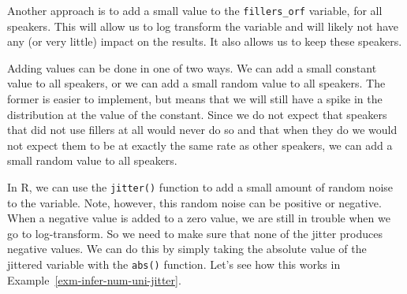 \documentclass[
  letterpaper,
  krantz1]{latex/krantz-mod}
\theoremstyle{definition}
\theoremstyle{definition}
\theoremstyle{remark}
\begin{document}
Another approach is to add a small value to the \texttt{fillers\_orf}
variable, for all speakers. This will allow us to log transform the
variable and will likely not have any (or very little) impact on the
results. It also allows us to keep these speakers.

Adding values can be done in one of two ways. We can add a small
constant value to all speakers, or we can add a small random value to
all speakers. The former is easier to implement, but means that we will
still have a spike in the distribution at the value of the constant.
Since we do not expect that speakers that did not use fillers at all
would never do so and that when they do we would not expect them to be
at exactly the same rate as other speakers, we can add a small random
value to all speakers.

In R, we can use the \texttt{jitter()} function to add a small amount of
random noise to the variable. Note, however, this random noise can be
positive or negative. When a negative value is added to a zero value, we
are still in trouble when we go to log-transform. So we need to make
sure that none of the jitter produces negative values. We can do this by
simply taking the absolute value of the jittered variable with the
\texttt{abs()} function. Let's see how this works in
Example~\ref{exm-infer-num-uni-jitter}.
\end{document}
